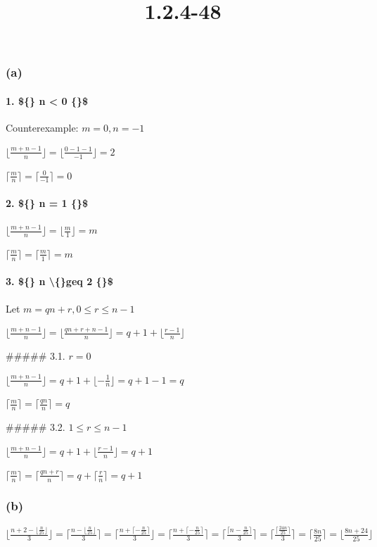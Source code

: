 \documentclass{article}
\title{1.2.4-48}
\begin{document}
\maketitle

\subsubsection*{(a)}

\paragraph*{1. \$\{\} n < 0 \{\}\$}

Counterexample: $m = 0, n = -1$

$\lfloor{\frac{m+n-1}{n}}\rfloor = \lfloor{\frac{0-1-1}{-1}}\rfloor = 2$

$\lceil{\frac{m}{n}}\rceil = \lceil{\frac{0}{-1}}\rceil = 0$

\paragraph*{2. \$\{\} n = 1 \{\}\$}

$\lfloor{\frac{m+n-1}{n}}\rfloor = \lfloor{\frac{m}{1}}\rfloor = m$

$\lceil{\frac{m}{n}}\rceil = \lceil{\frac{m}{1}}\rceil = m$

\paragraph*{3. \$\{\} n \textbackslash\{\}geq 2 \{\}\$}

Let $m = qn+r, 0 \leq r \leq n - 1$

$\lfloor{\frac{m+n-1}{n}}\rfloor = \lfloor{\frac{qn+r+n-1}{n}}\rfloor = q + 1 + \lfloor{\frac{r-1}{n}}\rfloor$

##### 3.1. $r = 0$

$\lfloor{\frac{m+n-1}{n}}\rfloor = q + 1 + \lfloor{-\frac{1}{n}}\rfloor = q + 1 - 1 = q$

$\lceil{\frac{m}{n}}\rceil = \lceil{\frac{qn}{n}}\rceil = q$

##### 3.2. $1 \leq r \leq n - 1$

$\lfloor{\frac{m+n-1}{n}}\rfloor = q + 1 + \lfloor{\frac{r-1}{n}}\rfloor = q + 1$

$\lceil{\frac{m}{n}}\rceil = \lceil{\frac{qn+r}{n}}\rceil = q + \lceil{\frac{r}{n}}\rceil = q + 1$

\subsubsection*{(b)}

$\lfloor{\frac{n+2 - \lfloor{\frac{n}{25}}\rfloor}{3}}\rfloor = \lceil{\frac{n - \lfloor{\frac{n}{25}}\rfloor}{3}}\rceil = \lceil{\frac{n + \lceil{-\frac{n}{25}}\rceil}{3}}\rfloor = \lceil{\frac{n + \lceil{-\frac{n}{25}}\rceil}{3}}\rceil = \lceil{\frac{\lceil{n-\frac{n}{25}}\rceil}{3}}\rceil = \lceil{\frac{\lceil{\frac{24n}{25}}\rceil}{3}}\rceil = \lceil{\frac{8n}{25}}\rceil = \lfloor{\frac{8n+24}{25}}\rfloor$
\end{document}
